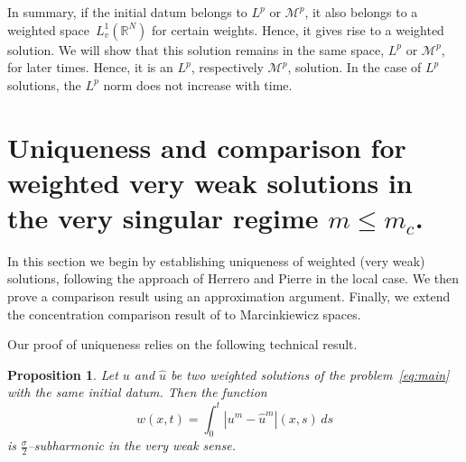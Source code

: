 \documentclass[leqno,12pt]{amsart}
\newtheorem{proposition}[theorem]{Proposition}
\theoremstyle{definition}
\theoremstyle{remark}
\numberwithin{equation}{section}
\begin{document}
In summary, if the initial datum belongs to $L^p$ or $\mathcal{M}^p$, it also belongs to a weighted space~$L^1_v(\mathbb{R}^N)$ for certain weights. Hence, it gives rise to a weighted solution. We will show that this solution remains in the same space, $L^p$ or $\mathcal{M}^p$, for later times. Hence,  it is an $L^p$, respectively $\mathcal{M}^p$, solution. In the case of $L^p$ solutions, the $L^p$ norm does not increase with time.




\section{\texorpdfstring
{Uniqueness and comparison for weighted very weak solutions in the very singular regime $m\le m_c$.}{Uniqueness and comparison for weighted very weak solutions in the very singular regime m <= mc.}}\label{sec:uniqueness,comparison}

In this section we begin by establishing uniqueness of weighted (very weak) solutions, following the approach of Herrero and Pierre \cite{herreropierre} in the local case. We then prove a comparison result using an approximation argument. Finally, we extend the concentration comparison result of \cite{volzone} to  Marcinkiewicz spaces. 

Our proof of uniqueness relies on the following technical result. 

\begin{proposition}\label{subharmonic}
 Let $u$ and $\hat{u}$ be two weighted solutions of the problem~\eqref{eq:main} with the same initial datum. Then the function 
\begin{equation}\label{w}
    w(x,t)=\int_{0}^{t}|u^{m}-\hat{u}^{m}|(x,s)\,ds
\end{equation} 
is $\frac\sigma2$--subharmonic in the very weak sense.
\end{proposition}
\end{document}
